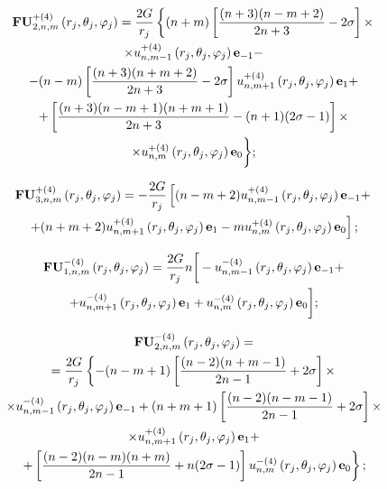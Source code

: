\begin{russian}
\begin{multline}
{\bf{FU}}_{2,n,m}^{ + (4)}\left( {{r_j},{\theta _j},{\varphi _j}} \right) = \frac{{2G}}{{{r_j}}}\left\{ {(n + m)\left[ {\frac{{(n + 3)(n - m + 2)}}{{2n + 3}} - 2\sigma } \right] \times } \right.\\
\times u_{n,m - 1}^{ + (4)}\left( {{r_j},{\theta _j},{\varphi _j}} \right){{\bf{e}}_{ - 1}} - \\
- (n - m)\left[ {\frac{{(n + 3)(n + m + 2)}}{{2n + 3}} - 2\sigma } \right]u_{n,m + 1}^{ + (4)}\left( {{r_j},{\theta _j},{\varphi _j}} \right){{\bf{e}}_1} + \\
+ \left[ {\frac{{(n + 3)(n - m + 1)(n + m + 1)}}{{2n + 3}} - (n + 1)(2\sigma  - 1)} \right] \times \\
\times u_{n,m}^{ + (4)}\left( {{r_j},{\theta _j},{\varphi _j}} \right){{\bf{e}}_0} \bigg\};
\label{eq:8:f2}
\end{multline}

\begin{multline}
{\bf{FU}}_{3,n,m}^{ + (4)}\left( {{r_j},{\theta _j},{\varphi _j}} \right) =  - \frac{{2G}}{{{r_j}}}\left[ {(n - m + 2)u_{n,m - 1}^{ + (4)}\left( {{r_j},{\theta _j},{\varphi _j}} \right){{\bf{e}}_{ - 1}} + } \right.\\
\left. { + (n + m + 2)u_{n,m + 1}^{ + (4)}\left( {{r_j},{\theta _j},{\varphi _j}} \right){{\bf{e}}_1} - mu_{n,m}^{ + (4)}\left( {{r_j},{\theta _j},{\varphi _j}} \right){{\bf{e}}_0}} \right];
\label{eq:8:f3}
\end{multline}

\begin{multline}
{\bf{FU}}_{1,n,m}^{ - (4)}\left( {{r_j},{\theta _j},{\varphi _j}} \right) = \frac{{2G}}{{{r_j}}}n\bigg[ - u_{n,m - 1}^{ - (4)}\left( {{r_j},{\theta _j},{\varphi _j}} \right){{\bf{e}}_{ - 1}} + \\
+ u_{n,m + 1}^{ - (4)}\left( {{r_j},{\theta _j},{\varphi _j}} \right){{\bf{e}}_1} + u_{n,m}^{ - (4)}\left( {{r_j},{\theta _j},{\varphi _j}} \right){{\bf{e}}_0} \bigg];
\label{eq:8:f4}
\end{multline}

\begin{multline}
{\bf{FU}}_{2,n,m}^{ - (4)}\left( {{r_j},{\theta _j},{\varphi _j}} \right) = \\
= \frac{{2G}}{{{r_j}}}\left\{ { - (n - m + 1)\left[ {\frac{{(n - 2)(n + m - 1)}}{{2n - 1}} + 2\sigma } \right] \times } \right.\\
\times u_{n,m - 1}^{ - (4)}\left( {{r_j},{\theta _j},{\varphi _j}} \right){{\bf{e}}_{ - 1}} + (n + m + 1)\left[ {\frac{{(n - 2)(n - m - 1)}}{{2n - 1}} + 2\sigma } \right] \times \\
\times u_{n,m + 1}^{ + (4)}\left( {{r_j},{\theta _j},{\varphi _j}} \right){{\bf{e}}_1} + \\
\left. { + \left[ {\frac{{(n - 2)(n - m)(n + m)}}{{2n - 1}} + n(2\sigma  - 1)} \right]u_{n,m}^{ - (4)}\left( {{r_j},{\theta _j},{\varphi _j}} \right){{\bf{e}}_0}} \right\};
\label{eq:8:f5}
\end{multline}


\end{russian}
